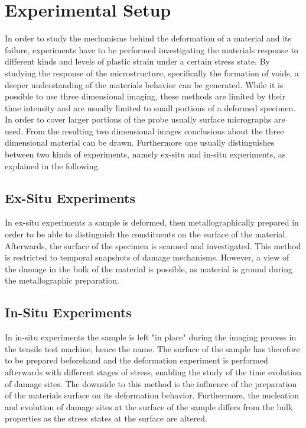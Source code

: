 \section{Experimental Setup}

In order to study the mechanisms behind the deformation of a material and its failure, experiments have to be performed investigating the materials response to different kinds and levels of plastic strain under a certain stress state. By studying the response of the microstructure, specifically the formation of voids, a deeper understanding of the materials behavior can be generated. While it is possible to use three dimensional imaging, these methods are limited by their time intensity and are usually limited to small portions of a deformed specimen. In order to cover larger portions of the probe usually surface micrographs are used. From the resulting two dimensional images conclusions about the three dimensional material can be drawn. Furthermore one usually distinguishes between two kinds of experiments, namely ex-situ and in-situ experiments, as explained in the following. \\
 
\subsection{Ex-Situ Experiments}

In ex-situ experiments a sample is deformed, then metallographically prepared in order to be able to distinguish the constituents on the surface of the material. Afterwards, the surface of the specimen is scanned and investigated. This method is restricted to temporal snapshots of damage mechanisms. However, a view of the damage in the bulk of the material is possible, as material is ground during the metallographic preparation. %

\subsection{In-Situ Experiments}

In in-situ experiments the sample is left "in place" during the imaging process in the tensile test machine, hence the name. The surface of the sample has therefore to be prepared beforehand and the deformation experiment is performed afterwards with different stages of stress, enabling the study of the time evolution of damage sites. The downside to this method is the influence of the preparation of the materials surface on its deformation behavior. Furthermore, the nucleation and evolution of damage sites at the surface of the sample differs from the bulk properties as the stress states at the surface are altered. \\ %



